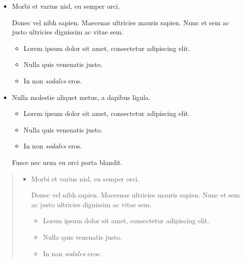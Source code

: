 \begin{tcolorbox}[toptitle=-1mm,bottomtitle=1mm,colback=admonition-note!50!white,colframe=admonition-note,title=\textbf{Large lists in admonitions}]
\begin{itemize}
\item Morbi et varius nisl, eu semper orci.

Donec vel nibh sapien. Maecenas ultricies mauris sapien. Nunc et sem ac justo ultricies dignissim ac vitae sem.

\begin{itemize}
\item Lorem ipsum dolor sit amet, consectetur adipiscing elit.


\item Nulla quis venenatis justo.


\item In non \emph{sodales} eros.

\end{itemize}

\item Nulla molestie aliquet metus, a dapibus ligula.

\begin{itemize}
\item[1. ] Lorem ipsum dolor sit amet, consectetur adipiscing elit.


\item[2. ] Nulla quis venenatis justo.


\item[3. ] In non \emph{sodales} eros.

\end{itemize}
Fusce nec urna eu orci porta blandit.

\end{itemize}
\end{tcolorbox}


\begin{quote}
\begin{itemize}
\item Morbi et varius nisl, eu semper orci.

Donec vel nibh sapien. Maecenas ultricies mauris sapien. Nunc et sem ac justo ultricies dignissim ac vitae sem.

\begin{itemize}
\item Lorem ipsum dolor sit amet, consectetur adipiscing elit.


\item Nulla quis venenatis justo.


\item In non \emph{sodales} eros.

\end{itemize}
\end{itemize}
\end{quote}


